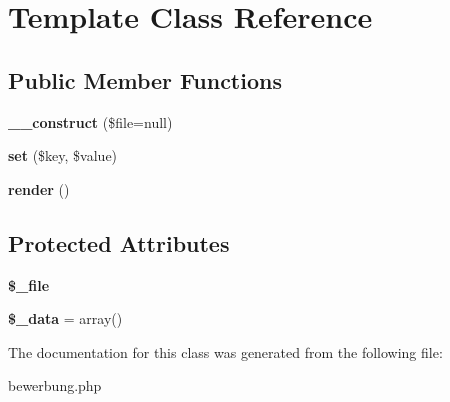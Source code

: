 \hypertarget{class_template}{\section{Template Class Reference}
\label{class_template}
}
\subsection*{Public Member Functions}
\begin{DoxyCompactItemize}
\item 
\hypertarget{class_template_a6d2f27fb29f8037969608953e4510428}{{\bfseries \-\_\-\-\_\-construct} (\$file=null)}\label{class_template_a6d2f27fb29f8037969608953e4510428}

\item 
\hypertarget{class_template_aab787bd83f84f4215dceb35f7c305eee}{{\bfseries set} (\$key, \$value)}\label{class_template_aab787bd83f84f4215dceb35f7c305eee}

\item 
\hypertarget{class_template_afde88292c44dc59faf017738dae6dffb}{{\bfseries render} ()}\label{class_template_afde88292c44dc59faf017738dae6dffb}

\end{DoxyCompactItemize}
\subsection*{Protected Attributes}
\begin{DoxyCompactItemize}
\item 
\hypertarget{class_template_abddaf0b77086e2b7d920f5d1a9616889}{{\bfseries \$\-\_\-file}}\label{class_template_abddaf0b77086e2b7d920f5d1a9616889}

\item 
\hypertarget{class_template_a5a3006290f2de94fff2dd63ca739d15a}{{\bfseries \$\-\_\-data} = array()}\label{class_template_a5a3006290f2de94fff2dd63ca739d15a}

\end{DoxyCompactItemize}


The documentation for this class was generated from the following file\-:\begin{DoxyCompactItemize}
\item 
bewerbung.\-php\end{DoxyCompactItemize}
